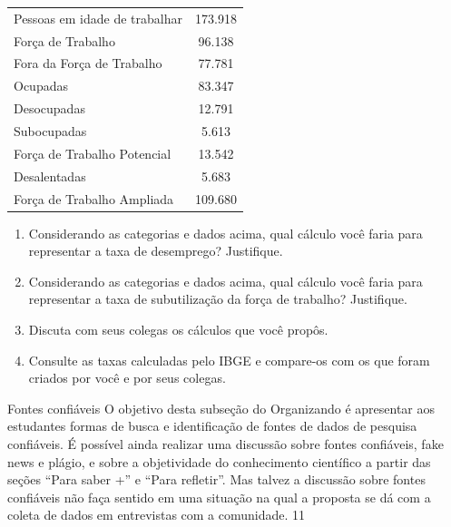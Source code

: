 \begin{table}[H]
\centering

\begin{tabu} to \textwidth{|l|c|}
\hline
{} &  \\
\hline
Pessoas em idade de trabalhar & 173.918 \\
\hline
Força de Trabalho & 96.138 \\
\hline
Fora da Força de Trabalho & 77.781 \\
\hline
Ocupadas & 83.347 \\
\hline
Desocupadas & 12.791 \\
\hline
Subocupadas & 5.613 \\
\hline
Força de Trabalho Potencial & 13.542 \\
\hline
Desalentadas & 5.683 \\
\hline
Força de Trabalho Ampliada & 109.680 \\
\hline
\end{tabu}
\end{table}

\begin{enumerate}
\item Considerando as categorias e dados acima, qual cálculo você faria para representar a taxa de desemprego? Justifique.
\item Considerando as categorias e dados acima, qual cálculo você faria para representar a taxa de subutilização da força de trabalho? Justifique.
\item Discuta com seus colegas os cálculos que você propôs.
\item Consulte as taxas calculadas pelo IBGE e compare-os com os que foram criados por você e por seus colegas.
\end{enumerate}

\clearpage\begin{objectives}{Fontes confiáveis}
{
  O objetivo desta subseção do Organizando é apresentar aos estudantes formas de busca e identificação de fontes de dados de pesquisa confiáveis. É possível ainda realizar uma discussão sobre fontes confiáveis, fake news e plágio, e sobre a objetividade do conhecimento científico a partir das seções “Para saber +” e “Para refletir”. Mas talvez a discussão sobre fontes confiáveis não faça sentido em uma situação na qual a proposta se dá com a coleta de dados em entrevistas com a comunidade.
}{1}{1}
\end{objectives}

